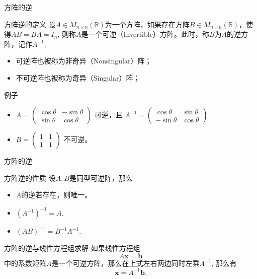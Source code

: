 
\begin{frame}{方阵的逆}

\begin{block}{方阵逆的定义}
设$A\in M_{n\times n}(\mathbb{R})$为一个方阵，如果存在方阵$B\in M_{n\times n}(\mathbb{R})$，使得$AB = BA = I_n$, 则称$A$是一个可逆（Invertible）方阵。此时，称$B$为$A$的逆方阵，记作$A^{-1}$.

\pause

\begin{itemize}
\item 可逆阵也被称为非奇异（Nonsingular）阵；
\item 不可逆阵也被称为奇异（Singular）阵；
\end{itemize}
\end{block}

\pause

\begin{block}{例子}
\begin{itemize}
\item \(\displaystyle A = \begin{pmatrix}
\cos\theta & -\sin\theta \\ \sin\theta & \cos\theta \end{pmatrix} \text{ 可逆，且 } A^{-1} = \begin{pmatrix}
\cos\theta & \sin\theta \\ -\sin\theta & \cos\theta \end{pmatrix} \)
\item \(\displaystyle B = \begin{pmatrix}
1 & 1 \\ 1 & 1 \end{pmatrix} \text{ 不可逆。}\)
\end{itemize}
\end{block}

\end{frame}


\begin{frame}{方阵的逆}

\begin{block}{方阵逆的性质}
设$A, B$是同型可逆阵，那么
\begin{itemize}
\item $A$的逆若存在，则唯一。
\item $(A^{-1})^{-1} = A$.
\item $(AB)^{-1} = B^{-1}A^{-1}$.
\end{itemize}
\end{block}

\pause

\begin{block}{方阵的逆与线性方程组求解}
如果线性方程组
$$A\mathbf{x} = \mathbf{b}$$
中的系数矩阵$A$是一个{\color{red}可逆方阵}，那么在上式左右两边同时左乘$A^{-1}$, 那么有
$$\mathbf{x} = A^{-1}\mathbf{b}.$$
\end{block}

\end{frame}

